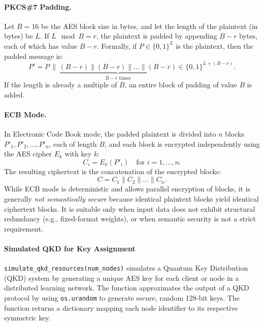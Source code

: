 \documentclass[10pt]{article}
\begin{document}
\paragraph{PKCS\#7 Padding.} Let \( B = 16 \) be the AES block size in bytes, and let the length of the plaintext (in bytes) be \( L \). If \( L \mod B = r \), the plaintext is padded by appending \( B - r \) bytes, each of which has value \( B - r \). Formally, if \( P \in \{0,1\}^{L} \) is the plaintext, then the padded message is:
\[
P' = P \, \| \, \underbrace{(B - r)\|(B - r)\|\dots\|(B - r)}_{B - r \text{ times}} \in \{0,1\}^{L + (B - r)}.
\]
If the length is already a multiple of \( B \), an entire block of padding of value \( B \) is added.
\paragraph{ECB Mode.} In Electronic Code Book mode, the padded plaintext is divided into \( n \) blocks \( P'_1, P'_2, \ldots, P'_n \), each of length \( B \), and each block is encrypted independently using the AES cipher \( E_k \) with key \( k \):
\[
C_i = E_k(P'_i) \quad \text{for } i = 1, \dots, n.
\]
The resulting ciphertext is the concatenation of the encrypted blocks:
\[
C = C_1 \| C_2 \| \dots \| C_n.
\]
While ECB mode is deterministic and allows parallel encryption of blocks, it is generally \emph{not semantically secure} because identical plaintext blocks yield identical ciphertext blocks. It is suitable only when input data does not exhibit structural redundancy (e.g., fixed-format weights), or when semantic security is not a strict requirement.
\paragraph{Simulated QKD for Key Assignment}
\texttt{simulate\_qkd\_resources(num\_nodes)} simulates a Quantum Key Distribution (QKD) system by generating a unique AES key for each client or node in a distributed learning network. The function approximates the output of a QKD protocol by using \texttt{os.urandom} to generate secure, random 128-bit keys. The function returns a dictionary mapping each node identifier to its respective symmetric key.
\end{document}

